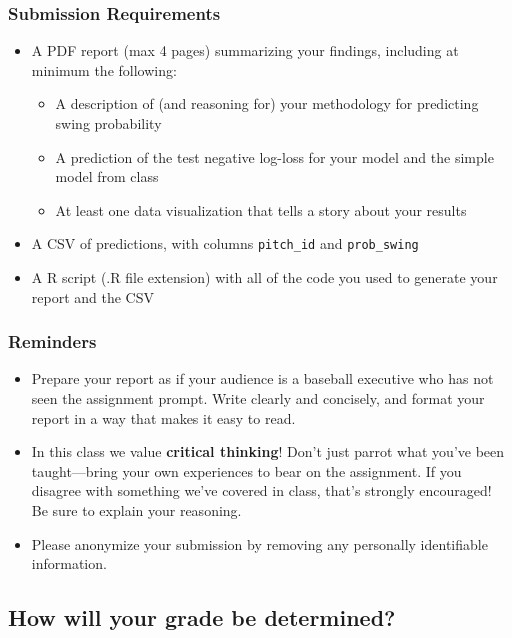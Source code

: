 \documentclass{article}
\begin{document}
      \subsubsection*{\sc Submission Requirements}

        \begin{itemize}
          \item A PDF report (max 4 pages) summarizing your findings, including at minimum the following:
          \begin{itemize}
            \item A description of (and reasoning for) your methodology for predicting swing probability
            \item A prediction of the test negative log-loss for your model and the simple model from class
            \item At least one data visualization that tells a story about your results
          \end{itemize}
          \item A CSV of predictions, with columns \texttt{pitch\_id} and \texttt{prob\_swing}
          \item A R script (.R file extension) with all of the code you used to generate your report and the CSV
        \end{itemize}

      \subsubsection*{\sc Reminders}

        \begin{itemize}
          \item Prepare your report as if your audience is a baseball executive who has not seen the assignment prompt. Write clearly and concisely, and format your report in a way that makes it easy to read.
          \item In this class we value {\bf critical thinking}! Don't just parrot what you've been taught---bring your own experiences to bear on the assignment. If you disagree with something we've covered in class, that's strongly encouraged! Be sure to explain your reasoning.
          \item Please anonymize your submission by removing any personally identifiable information.
        \end{itemize}

    \subsection*{\sc How will your grade be determined?}
\end{document}
